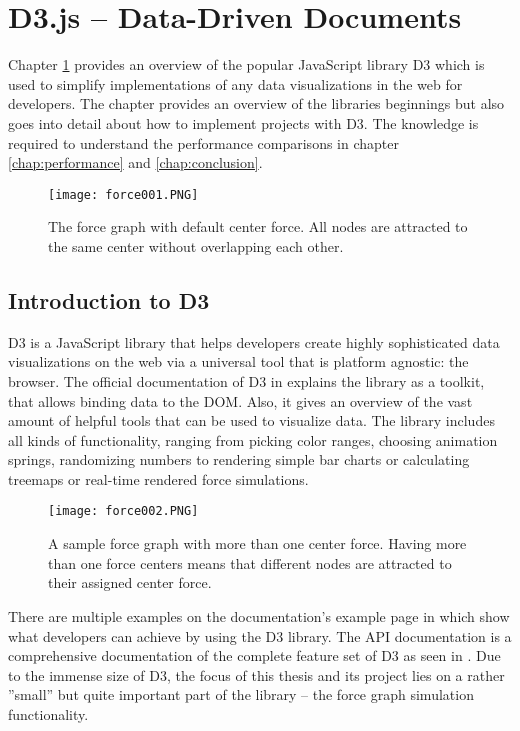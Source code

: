 \chapter{D3.js – Data-Driven Documents}
\label{cha:d3js}

Chapter \ref{cha:d3js} provides an overview of the popular JavaScript library D3 which is used to simplify implementations of any data visualizations in the web for developers. The chapter provides an overview of the libraries beginnings but also goes into detail about how to implement projects with D3. The knowledge is required to understand the performance comparisons in chapter \ref{chap:performance} and \ref{chap:conclusion}.

\begin{figure}
    \centering
    \texttt{[image: force001.PNG]}
    \caption{The force graph with default center force. All nodes are attracted to the same center without overlapping each other.}
    \label{fig:force001}
  \end{figure}

\section{Introduction to D3}

D3 is a JavaScript library that helps developers create highly sophisticated data visualizations on the web via a universal tool that is platform agnostic: the browser. The official documentation of D3 in \cite[Introduction]{D3Website} explains the library as a toolkit, that allows binding data to the DOM. Also, it gives an overview of the vast amount of helpful tools that can be used to visualize data. The library includes all kinds of functionality, ranging from picking color ranges, choosing animation springs, randomizing numbers to rendering simple bar charts or calculating treemaps or real-time rendered force simulations.

\begin{figure}
  \centering
  \texttt{[image: force002.PNG]}
  \caption{A sample force graph with more than one center force. Having more than one force centers means that different nodes are attracted to their assigned center force.}
  \label{fig:force002}
\end{figure}

\begin{emergency}{1em}
There are multiple examples on the documentation's example page in \cite{D3Examples} which show what developers can achieve by using the D3 library. The API documentation is a comprehensive documentation of the complete feature set of D3 as seen in \cite[\mbox{/d3/blob/master/API.md}]{D3Github}. Due to the immense size of D3, the focus of this thesis and its project lies on a rather ''small'' but quite important part of the library -- the force graph simulation functionality.
\end{emergency}

